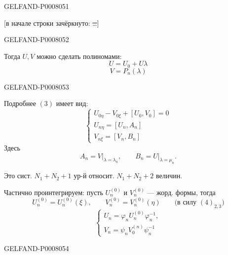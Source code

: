 \begin{GelfandAdjacentEvidence}{GELFAND-P000805}{1}

[в начале строки зачёркнуто: \sout{\ldots}]
\end{GelfandAdjacentEvidence}
\begin{GelfandAdjacentEvidence}{GELFAND-P000805}{2}


Тогда \(U,V\) можно сделать полиномами:
\[
U=U_0+U\lambda
\]
\[
V=P_n(\lambda)
\]
\end{GelfandAdjacentEvidence}
\begin{GelfandAdjacentEvidence}{GELFAND-P000805}{3}


Подробнее \((3)\) имеет вид:
\begin{equation*}
\begin{cases}
U_{0\eta}-V_{0\xi}+[U_0,V_0]=0\\
U_{n\eta}=[U_n,A_n]\\
V_{n\xi}=[V_n,B_n]
\end{cases}
\tag{4}
\end{equation*}
Здесь
\begin{equation*}
A_n=V\big|_{\lambda=\lambda_n},\qquad
B_n=U\big|_{\lambda=\mu_n}.
\tag{5}
\end{equation*}

Это сист. \(N_1+N_2+1\) ур-й относит. \(N_1+N_2+2\) величин.

Частично проинтегрируем: пусть \(U_n^{(0)}\) и \(V_n^{(0)}\) --- жорд. формы,
тогда
\begin{equation*}
U_n^{(0)}=U_n^{(0)}(\xi),\qquad
V_n^{(0)}=V_n^{(0)}(\eta)
\qquad\text{(в силу \((4)_{2,3}\))}
\tag{6}
\end{equation*}
\begin{equation*}
\begin{cases}
U_n=\varphi_n U_n^{(0)}\varphi_n^{-1},\\
V_n=\psi_n V_0^{(n)}\psi_n^{-1}
\end{cases}
\tag{7}
\end{equation*}
\end{GelfandAdjacentEvidence}
\begin{GelfandAdjacentEvidence}{GELFAND-P000805}{4}

\end{GelfandAdjacentEvidence}
